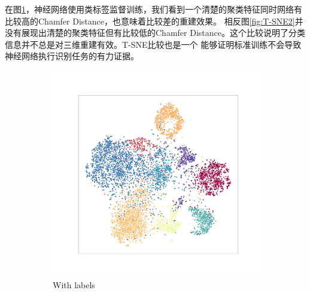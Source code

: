 \documentclass[bachelor, nocolorlinks, printoneside]{seuthesis} %
\begin{document}
\begin{Main}
\begin{enumerate}
    在图\ref{fig:T-SNE1}，神经网络使用类标签监督训练，我们看到一个清楚的聚类特征同时网络有比较高的Chamfer Distance，也意味着比较差的重建效果。
    相反图\ref{fig:T-SNE2}并没有展现出清楚的聚类特征但有比较低的Chamfer Distance。这个比较说明了分类信息并不总是对三维重建有效。T-SNE比较也是一个
    能够证明标准训练不会导致神经网络执行识别任务的有力证据。
\end{enumerate}

\begin{figure}
	\begin{subfigure}[t]{0.3\linewidth} \centering 
     \includegraphics[width=\columnwidth]{figs/T-SNE-class.png}
     \caption{With labels}\label{fig:T-SNE1}
   \end{subfigure}
   \begin{subfigure}[t]{0.3\linewidth} \centering

\end{subfigure}
\end{figure}
\end{Main}
\end{document}
